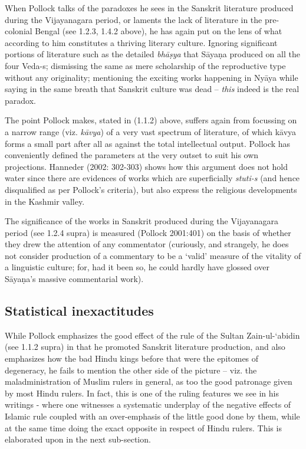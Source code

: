 When Pollock talks of the paradoxes he sees in the Sanskrit literature produced during the Vijayanagara period, or laments the lack of literature in the pre-colonial Bengal (see 1.2.3, 1.4.2 above), he has again put on the lens of what according to him constitutes a thriving literary culture. Ignoring significant portions of literature such as the detailed {\sl bhāṣya} that Sāyaṇa produced on all the four Veda-s; dismissing the same as mere scholarship of the reproductive type without any originality; mentioning the exciting works happening in Nyāya while saying in the same breath that Sanskrit culture was dead – {\sl this} indeed is the real paradox.

The point Pollock makes, stated in (1.1.2) above, suffers again from focussing on a narrow range (viz. {\sl kāvya}) of a very vast spectrum of literature, of which kāvya forms a small part after all as against the total intellectual output. Pollock has conveniently defined the parameters at the very outset to suit his own projections. Hanneder (2002: 302-303) shows how this argument does not hold water since there are evidences of works which are superficially {\sl stuti-s} (and hence disqualified as per Pollock’s criteria), but also express the religious developments in the Kashmir valley. 

The significance of the works in Sanskrit produced during the Vijayanagara period (see 1.2.4 supra) is measured (Pollock 2001:401) on the basis of whether they drew the attention of any commentator (curiously, and strangely, he does not consider production of a commentary to be a ‘valid’ measure of the vitality of a linguistic culture; for, had it been so, he could hardly have glossed over Sāyaṇa’s massive commentarial work). 

\subsection{Statistical inexactitudes}

While Pollock emphasizes the good effect of the rule of the Sultan Zain-ul-‘abidin (see 1.1.2 supra) in that he promoted Sanskrit literature production, and also emphasizes how the bad Hindu kings before that were the epitomes of degeneracy, he fails to mention the other side of the picture – viz. the maladministration of Muslim rulers in general, as too the good patronage given by most Hindu rulers. In fact, this is one of the ruling features we see in his writings - where one witnesses a systematic underplay of the negative effects of Islamic rule coupled with an over-emphasis of  the little good done by them, while at the same time doing the exact opposite in respect of Hindu rulers. This is elaborated upon in the next sub-section.

